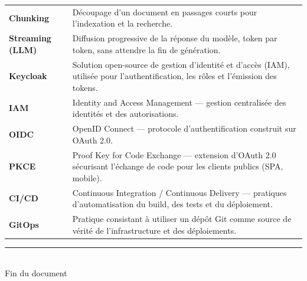 \documentclass[12pt,a4paper]{article}
\begin{document}
\begin{longtable}{>{\bfseries\color{primary}}p{3.5cm} p{10cm}}
    \rowcolor{lightgray}
    Chunking & Découpage d'un document en passages courts pour l'indexation et la recherche. \\
    Streaming (LLM) & Diffusion progressive de la réponse du modèle, token par token, sans attendre la fin de génération. \\
    \rowcolor{lightgray}
    Keycloak & Solution open-source de gestion d'identité et d'accès (IAM), utilisée pour l'authentification, les rôles et l'émission des tokens. \\
    IAM & Identity and Access Management --- gestion centralisée des identités et des autorisations. \\
    \rowcolor{lightgray}
    OIDC & OpenID Connect --- protocole d'authentification construit sur OAuth 2.0. \\
    PKCE & Proof Key for Code Exchange --- extension d'OAuth 2.0 sécurisant l'échange de code pour les clients publics (SPA, mobile). \\
    \rowcolor{lightgray}
    CI/CD & Continuous Integration / Continuous Delivery --- pratiques d'automatisation du build, des tests et du déploiement. \\
    GitOps & Pratique consistant à utiliser un dépôt Git comme source de vérité de l'infrastructure et des déploiements. \\
    \bottomrule
\end{longtable}

\vfill
\begin{center}
    {\color{primary}\rule{0.5\textwidth}{0.5pt}}\\
    \vspace{0.3cm}
    {\small\color{darkgray}Fin du document}
\end{center}
\end{document}
